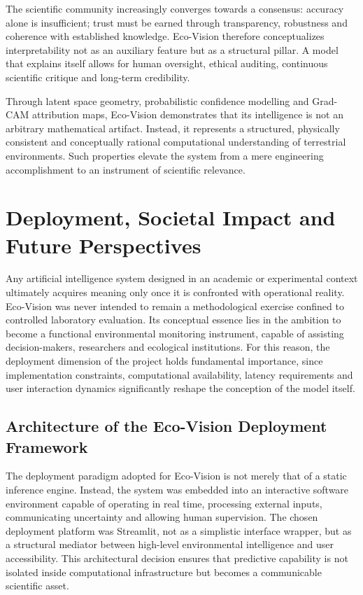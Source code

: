 \documentclass[12pt,a4paper]{report}
\begin{document}
The scientific community increasingly converges towards a consensus: accuracy alone is insufficient; trust must be earned through transparency, robustness and coherence with established knowledge. Eco-Vision therefore conceptualizes interpretability not as an auxiliary feature but as a structural pillar. A model that explains itself allows for human oversight, ethical auditing, continuous scientific critique and long-term credibility.

Through latent space geometry, probabilistic confidence modelling and Grad-CAM attribution maps, Eco-Vision demonstrates that its intelligence is not an arbitrary mathematical artifact. Instead, it represents a structured, physically consistent and conceptually rational computational understanding of terrestrial environments. Such properties elevate the system from a mere engineering accomplishment to an instrument of scientific relevance.

\newpage


\chapter{Deployment, Societal Impact and Future Perspectives}

Any artificial intelligence system designed in an academic or experimental context ultimately acquires meaning only once it is confronted with operational reality. Eco-Vision was never intended to remain a methodological exercise confined to controlled laboratory evaluation. Its conceptual essence lies in the ambition to become a functional environmental monitoring instrument, capable of assisting decision-makers, researchers and ecological institutions. For this reason, the deployment dimension of the project holds fundamental importance, since implementation constraints, computational availability, latency requirements and user interaction dynamics significantly reshape the conception of the model itself.

\section{Architecture of the Eco-Vision Deployment Framework}

The deployment paradigm adopted for Eco-Vision is not merely that of a static inference engine. Instead, the system was embedded into an interactive software environment capable of operating in real time, processing external inputs, communicating uncertainty and allowing human supervision. The chosen deployment platform was Streamlit, not as a simplistic interface wrapper, but as a structural mediator between high-level environmental intelligence and user accessibility. This architectural decision ensures that predictive capability is not isolated inside computational infrastructure but becomes a communicable scientific asset.
\end{document}

